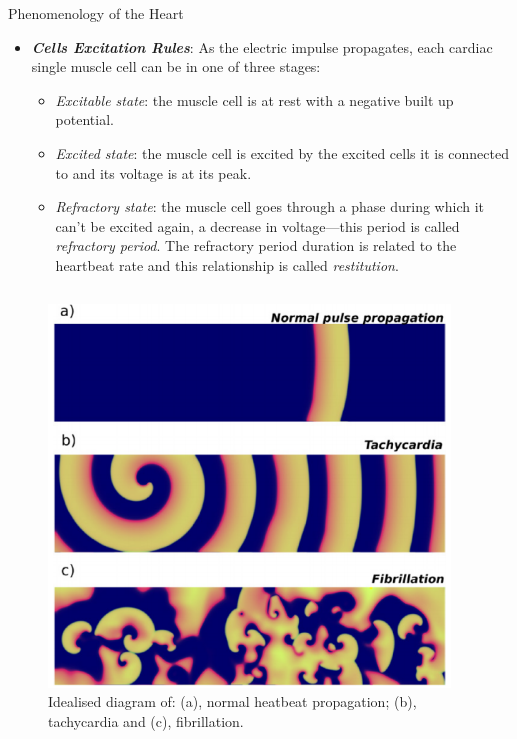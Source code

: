 \documentclass[final,hyperref={pdfpagelabels=false}]{beamer}
\begin{document}
\begin{frame}[t]
\begin{columns}[t]
\begin{column}{.465\textwidth}
\begin{block}{Phenomenology of the Heart}
\begin{itemize}
	\item \textbf{ \textit{Cells Excitation Rules}}: As the electric impulse propagates, each cardiac single muscle cell can be in one of three stages:

		\begin{itemize}
 		 \item \textit{Excitable state}: the muscle cell is at rest with a negative built up potential.
  										
  		\item \textit{Excited state}: the muscle cell is excited by the excited cells it is connected to and its voltage is at its peak. 
  		\item \textit{Refractory state}: the muscle cell goes through a phase during which it can't be excited again, a decrease in voltage---this period is called \textit{refractory period}. The refractory period duration is related to the heartbeat rate and this relationship is called \textit{restitution}.
		\end{itemize}  

\end{itemize}

\begin{columns}
\begin{column}{.43\textwidth}
\begin{figure}
	\includegraphics[width=0.95\textwidth]{spiralbreak2tachy}
	\caption{\label{fig:fib}Idealised diagram of: (a), normal heatbeat propagation; (b), tachycardia and (c), fibrillation. }
	\end{figure}



\end{column}
\end{columns}
\end{block}
\end{column}
\end{columns}
\end{frame}
\end{document}
